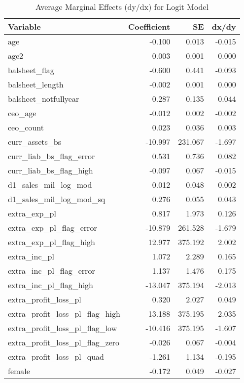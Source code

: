 \begin{table}

\caption{\label{tab:}Average Marginal Effects (dy/dx) for Logit Model}
\centering
\begin{tabular}[t]{l|r|r|r}
\hline
Variable & Coefficient & SE & dx/dy\\
\hline
age & -0.100 & 0.013 & -0.015\\
\hline
age2 & 0.003 & 0.001 & 0.000\\
\hline
balsheet\_flag & -0.600 & 0.441 & -0.093\\
\hline
balsheet\_length & -0.002 & 0.001 & 0.000\\
\hline
balsheet\_notfullyear & 0.287 & 0.135 & 0.044\\
\hline
ceo\_age & -0.012 & 0.002 & -0.002\\
\hline
ceo\_count & 0.023 & 0.036 & 0.003\\
\hline
curr\_assets\_bs & -10.997 & 231.067 & -1.697\\
\hline
curr\_liab\_bs\_flag\_error & 0.531 & 0.736 & 0.082\\
\hline
curr\_liab\_bs\_flag\_high & -0.097 & 0.067 & -0.015\\
\hline
d1\_sales\_mil\_log\_mod & 0.012 & 0.048 & 0.002\\
\hline
d1\_sales\_mil\_log\_mod\_sq & 0.276 & 0.055 & 0.043\\
\hline
extra\_exp\_pl & 0.817 & 1.973 & 0.126\\
\hline
extra\_exp\_pl\_flag\_error & -10.879 & 261.528 & -1.679\\
\hline
extra\_exp\_pl\_flag\_high & 12.977 & 375.192 & 2.002\\
\hline
extra\_inc\_pl & 1.072 & 2.289 & 0.165\\
\hline
extra\_inc\_pl\_flag\_error & 1.137 & 1.476 & 0.175\\
\hline
extra\_inc\_pl\_flag\_high & -13.047 & 375.194 & -2.013\\
\hline
extra\_profit\_loss\_pl & 0.320 & 2.027 & 0.049\\
\hline
extra\_profit\_loss\_pl\_flag\_high & 13.188 & 375.195 & 2.035\\
\hline
extra\_profit\_loss\_pl\_flag\_low & -10.416 & 375.195 & -1.607\\
\hline
extra\_profit\_loss\_pl\_flag\_zero & -0.026 & 0.067 & -0.004\\
\hline
extra\_profit\_loss\_pl\_quad & -1.261 & 1.134 & -0.195\\
\hline
female & -0.172 & 0.049 & -0.027\\

\end{tabular}
\end{table}
